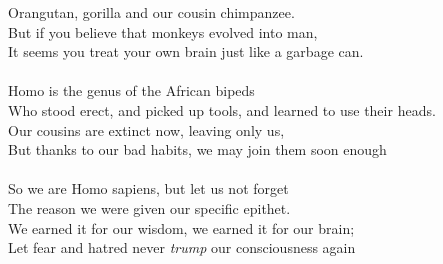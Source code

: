 \documentclass[twoside,13pt,openany,letterpaper]{memoir}%
\begin{document}
Orangutan, gorilla and our cousin chimpanzee.\\
But if you believe that monkeys evolved into man,\\
It seems you treat your own brain just like a garbage can.\\
\\
Homo is the genus of the African bipeds\\
Who stood erect, and picked up tools, and learned to use their heads.\\
Our cousins are extinct now, leaving only us,\\
But thanks to our bad habits, we may join them soon enough\\
\\
So we are Homo sapiens, but let us not forget\\
The reason we were given our specific epithet.\\
We earned it for our wisdom, we earned it for our brain;\\
Let fear and hatred never \textit{trump} our consciousness again\\
\end{document}
